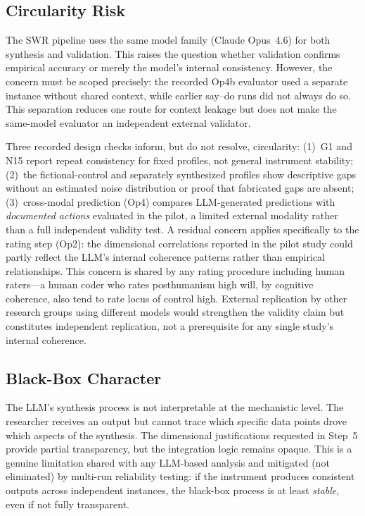 \documentclass[11pt,a4paper]{article}
\begin{document}
\subsection{Circularity Risk}
\label{sec:limitations:circularity}

The SWR pipeline uses the same model family (Claude Opus~4.6) for both synthesis and validation. This raises the question whether validation confirms empirical accuracy or merely the model's internal consistency. However, the concern must be scoped precisely: the recorded Op4b evaluator used a separate instance without shared context, while earlier say--do runs did not always do so. This separation reduces one route for context leakage but does not make the same-model evaluator an independent external validator.

Three recorded design checks inform, but do not resolve, circularity: (1)~G1 and N15 report repeat consistency for fixed profiles, not general instrument stability; (2)~the fictional-control and separately synthesized profiles show descriptive gaps without an estimated noise distribution or proof that fabricated gaps are absent; (3)~cross-modal prediction (Op4) compares LLM-generated predictions with \emph{documented actions} evaluated in the pilot, a limited external modality rather than a full independent validity test. A residual concern applies specifically to the rating step (Op2): the dimensional correlations reported in the pilot study could partly reflect the LLM's internal coherence patterns rather than empirical relationships. This concern is shared by any rating procedure including human raters---a human coder who rates posthumanism high will, by cognitive coherence, also tend to rate locus of control high. External replication by other research groups using different models would strengthen the validity claim but constitutes independent replication, not a prerequisite for any single study's internal coherence.


\subsection{Black-Box Character}
\label{sec:limitations:blackbox}

The LLM's synthesis process is not interpretable at the mechanistic level. The researcher receives an output but cannot trace which specific data points drove which aspects of the synthesis. The dimensional justifications requested in Step~5 provide partial transparency, but the integration logic remains opaque. This is a genuine limitation shared with any LLM-based analysis and mitigated (not eliminated) by multi-run reliability testing: if the instrument produces consistent outputs across independent instances, the black-box process is at least \emph{stable}, even if not fully transparent.
\end{document}
